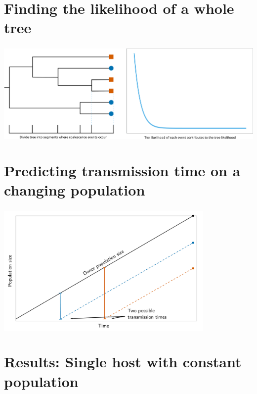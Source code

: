 \documentclass[aspectratio=169]{beamer}
\begin{document}
\section{Finding the likelihood of a whole tree}

\begin{frame} \frametitle{\insertsection}

    \centering\includegraphics[width=\textwidth]{images/tree-likelihood}

\end{frame}

\section{Predicting transmission time on a changing population}

\begin{frame} \frametitle{\insertsection}

    \centering\includegraphics[width=0.8\textwidth]{images/linear-time-location}

\end{frame}

\section{Results: Single host with constant population}
\end{document}
